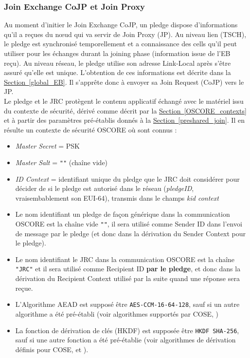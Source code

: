 \documentclass[]{report}
\newcommand{\wordlink}[2]{\hyperref[#2]{#1~\ref{#2}}}
\begin{document}
\newpage

\subsubsection{Join Exchange CoJP et Join Proxy}
\label{join_exchange_CoJP}

Au moment d'initier le Join Exchange CoJP, un pledge dispose d'informations qu'il a reçues du nœud qui va servir de Join Proxy (JP). Au niveau lien (TSCH), le pledge est synchronisé temporellement et a connaissance des cells qu'il peut utiliser pour les échanges durant la joining phase (information issue de l'EB reçu). Au niveau réseau, le pledge utilise son adresse Link-Local après s'être assuré qu'elle est unique. L'obtention de ces informations est décrite dans la \wordlink{Section}{global_EB}. Il s'apprête donc à envoyer sa Join Request (CoJP) vers le JP.\\


 Le pledge et le JRC protègent le contenu applicatif échangé avec le matériel issu du contexte de sécurité, dérivé comme décrit par la \wordlink{Section}{OSCORE_contexts} et à partir des paramètres pré-établis donnés à la \wordlink{Section}{preshared_join}. Il en résulte un contexte de sécurité OSCORE où sont connus :
 \vspace{0.1cm}
\begin{itemize}[label=$\bullet$]
\item \textit{Master Secret} = PSK

\item \textit{Master Salt} = \texttt{""} (chaîne vide)

\item \textit{ID Context} = identifiant unique du pledge que le JRC doit considérer pour décider de si le pledge est autorisé dans le réseau (\textit{pledgeID}, vraisembablement son EUI-64), transmis dans le champs \textit{kid context} 

\item Le nom identifiant un pledge de façon générique dans la communication OSCORE est la chaîne vide \texttt{""}, il sera utilisé comme Sender ID dans l'envoi de message par le pledge (et donc dans la dérivation du Sender Context pour le pledge).

\item Le nom identifiant le JRC dans la communication OSCORE est la chaîne \texttt{"JRC"} et il sera utilisé comme Recipient ID \textbf{par le pledge}, et donc dans la dérivation du Recipient Context utilisé par la suite quand une réponse sera reçue.

\item L'Algorithme AEAD est supposé être \texttt{AES-CCM-16-64-128}, sauf si un autre algorithme a été pré-établi (voir algorithmes supportés par COSE, \cite{rfc8152})

\item La fonction de dérivation de clés (HKDF) est supposée être \texttt{HKDF SHA-256}, sauf si une autre fonction a été pré-établie (voir algorithmes de dérivation définis pour COSE, \cite{rfc5869} et \cite{rfc5869}).
\end{itemize}
\end{document}
